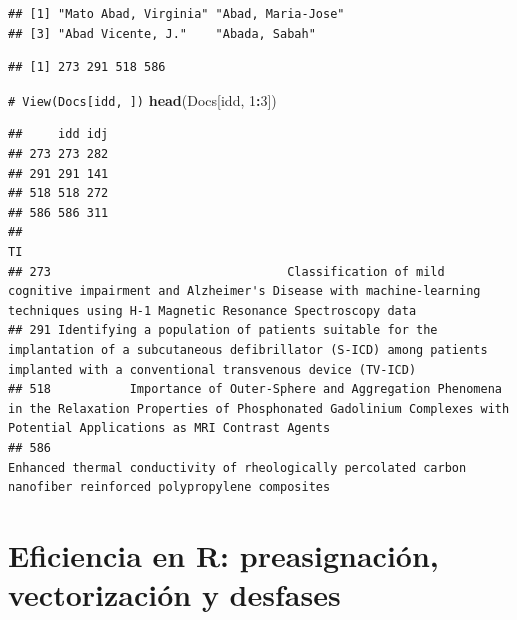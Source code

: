\documentclass[
]{book}
\newenvironment{Shaded}{\begin{snugshade}}{\end{snugshade}}
\newcommand{\CommentTok}[1]{\textcolor[rgb]{0.56,0.35,0.01}{\textit{#1}}}
\newcommand{\DecValTok}[1]{\textcolor[rgb]{0.00,0.00,0.81}{#1}}
\newcommand{\FunctionTok}[1]{\textcolor[rgb]{0.13,0.29,0.53}{\textbf{#1}}}
\newcommand{\NormalTok}[1]{#1}
\newcommand{\OtherTok}[1]{\textcolor[rgb]{0.56,0.35,0.01}{#1}}
\newcommand{\SpecialCharTok}[1]{\textcolor[rgb]{0.81,0.36,0.00}{\textbf{#1}}}
\theoremstyle{break}
\theoremstyle{nonumberplain}
\renewcommand{\CommentTok}[1]{\textcolor[rgb]{0.41,0.41,0.41}{\texttt{#1}}}
\begin{document}
\begin{verbatim}
## [1] "Mato Abad, Virginia" "Abad, Maria-Jose"   
## [3] "Abad Vicente, J."    "Abada, Sabah"
\end{verbatim}

\begin{Shaded}
\end{Shaded}

\begin{verbatim}
## [1] 273 291 518 586
\end{verbatim}

\begin{Shaded}
\begin{Highlighting}[]
\CommentTok{\# View(Docs[idd, ])}
\FunctionTok{head}\NormalTok{(Docs[idd, }\DecValTok{1}\SpecialCharTok{:}\DecValTok{3}\NormalTok{])}
\end{Highlighting}
\end{Shaded}

\begin{verbatim}
##     idd idj
## 273 273 282
## 291 291 141
## 518 518 272
## 586 586 311
##                                                                                                                                                                                      TI
## 273                                 Classification of mild cognitive impairment and Alzheimer's Disease with machine-learning techniques using H-1 Magnetic Resonance Spectroscopy data
## 291 Identifying a population of patients suitable for the implantation of a subcutaneous defibrillator (S-ICD) among patients implanted with a conventional transvenous device (TV-ICD)
## 518           Importance of Outer-Sphere and Aggregation Phenomena in the Relaxation Properties of Phosphonated Gadolinium Complexes with Potential Applications as MRI Contrast Agents
## 586                                                                      Enhanced thermal conductivity of rheologically percolated carbon nanofiber reinforced polypropylene composites
\end{verbatim}

\section{Eficiencia en R: preasignación, vectorización y desfases}\label{eficiencia-manipR}
\end{document}
